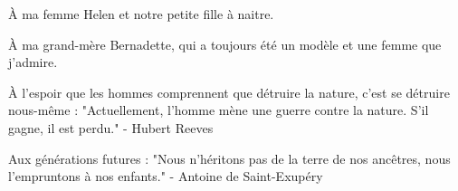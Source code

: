 \thispagestyle{empty} %
\vspace*{\fill} %
\begin{flushright}
    \begin{minipage}{0.7\textwidth} %
        À ma femme Helen et notre petite fille à naitre. \\
        
        \vspace{6pt}
        
        À ma grand-mère Bernadette, qui a toujours été un modèle et une femme que j'admire. \\
        
        \vspace{6pt}
        
        À l'espoir que les hommes comprennent que détruire la nature, c'est se détruire nous-même : "Actuellement, l'homme mène une guerre contre la nature. S'il gagne, il est perdu." - Hubert Reeves \\
        
        \vspace{6pt}
        
        Aux générations futures : "Nous n'héritons pas de la terre de nos ancêtres, nous l'empruntons à nos enfants." - Antoine de Saint-Exupéry
    \end{minipage}
\end{flushright}
\vspace*{\fill}
\restoregeometry %
